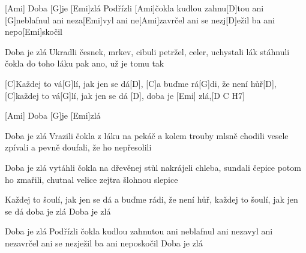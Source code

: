 

[Ami] Doba [G]je [Emi]zlá 
Podřízli [Ami]\null čokla kudlou zahnu[D]tou 
ani [G]neblafnul ani neza[Emi]vyl 
ani ne[Ami]zavrčel ani se nezj[D]ežil 
ba ani nepo[Emi]skočil 

Doba je zlá 
Ukradli česnek, mrkev, cibuli 
petržel, celer, uchystali lák 
stáhnuli čokla do toho láku pak 
ano, už je tomu tak 

[C]Každej to vá[G]lí, jak jen se dá[D],
[C]a buďme rá[G]di, že není hůř[D], 
[C]každej to vá[G]lí, jak jen se dá [D],
doba je [Emi] zlá,[D C H7]

[Ami] Doba [G]je [Emi]zlá 

Doba je zlá 
Vrazili čokla z láku na pekáč 
a kolem trouby mlsně chodili 
vesele zpívali a pevně doufali, 
že ho nepřesolili 

Doba je zlá 
vytáhli čokla na dřevěnej stůl 
nakrájeli chleba, sundali čepice 
potom ho zmařili, chutnal velice 
zejtra šlohnou slepice 

Každej to šoulí, jak jen se dá 
a buďme rádi, že není hůř, 
každej to šoulí, jak jen se dá 
doba je zlá
Doba je zlá

Doba je zlá 
Podřízli čokla kudlou zahnutou 
ani neblafnul ani nezavyl 
ani nezavrčel ani se nezježil 
ba ani neposkočil 
Doba je zlá